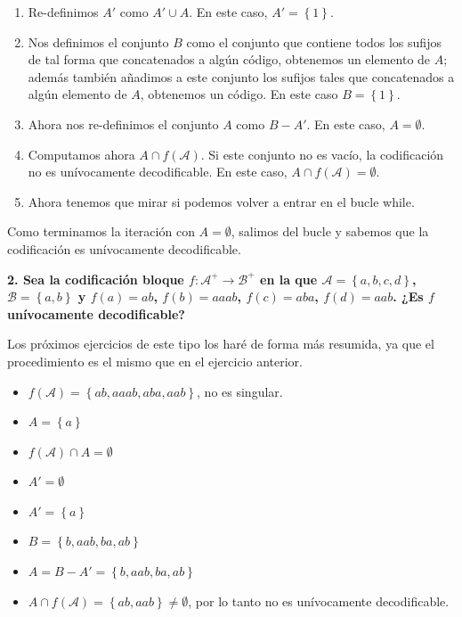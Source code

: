 \documentclass{article}
\begin{document}
\begin{enumerate}
    \item Re-definimos $A'$ como $A'\cup A$. En este caso, $A'=\left\{1\right\}$.
    \item Nos definimos el conjunto $B$ como el conjunto que contiene todos los sufijos de tal forma que concatenados a algún código, obtenemos un elemento de $A$; además también añadimos a este conjunto los sufijos tales que concatenados a algún elemento de $A$, obtenemos un código. En este caso $B=\left\{1\right\}$.
    \item Ahora nos re-definimos el conjunto $A$ como $B-A'$. En este caso, $A=\emptyset$.
    \item Computamos ahora $A\cap f\left(\mathcal{A}\right)$. Si este conjunto no es vacío, la codificación no es unívocamente decodificable. En este caso, $A\cap f\left(\mathcal{A}\right)=\emptyset$.
    \item Ahora tenemos que mirar si podemos volver a entrar en el bucle while.
\end{enumerate}

Como terminamos la iteración con $A=\emptyset$, salimos del bucle y sabemos que la codificación es unívocamente decodificable.

\vspace{1cm}

\textbf{
2. Sea la codificación bloque $f:\mathcal{A}^+\rightarrow\mathcal{B}^+$ en la que $\mathcal{A}=\left\{a,b,c,d\right\}$, $\mathcal{B}=\left\{a,b\right\}$ y $f(a)=ab$, $f(b) = aaab$, $f(c)=aba$, $f(d)=aab$. ¿Es $f$ unívocamente decodificable?
}

\vspace{0.5cm}

Los próximos ejercicios de este tipo los haré de forma más resumida, ya que el procedimiento es el mismo que en el ejercicio anterior.

\begin{itemize}
    \item $f\left(\mathcal{A}\right)=\left\{ab,aaab,aba,aab\right\}$, no es singular.
    \item $A=\left\{a\right\}$
    \item $f\left(\mathcal{A}\right)\cap A = \emptyset$
    \item $A'=\emptyset$
    \item $A'=\left\{a\right\}$
    \item $B = \left\{b, aab, ba, ab\right\}$
    \item $A = B-A' = \left\{b, aab, ba, ab\right\}$
    \item $A\cap f\left(\mathcal{A}\right) = \left\{ab, aab\right\}\neq\emptyset$, por lo tanto no es unívocamente decodificable.
\end{itemize}
\end{document}
